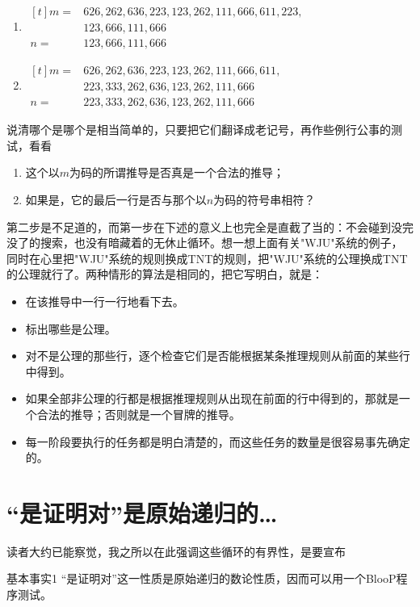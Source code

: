 \begin{enumerate}
\item $\begin{aligned}[t]
  m={}&626, 262, 636, 223, 123, 262, 111, 666, 611, 223,\\
      &123, 666, 111, 666\\
  n={}&123, 666, 111, 666
\end{aligned}$
\item $\begin{aligned}[t]
  m={}&626, 262, 636, 223, 123, 262, 111, 666, 611,\\
      &223, 333, 262, 636, 123, 262, 111, 666\\
  n={}&223, 333, 262, 636, 123, 262, 111, 666
\end{aligned}$
\end{enumerate}
说清哪个是哪个是相当简单的，只要把它们翻译成老记号，再作些例行公事的测试，看看
\begin{enumerate}
\item 这个以$m$为码的所谓推导是否真是一个合法的推导；
\item 如果是，它的最后一行是否与那个以$n$为码的符号串相符？
\end{enumerate}
第二步是不足道的，而第一步在下述的意义上也完全是直截了当的：不会碰到没完没了的搜索，也没有暗藏着的无休止循环。想一想上面有关"WJU"系统的例子，同时在心里把"WJU"系统的规则换成TNT的规则，把"WJU"系统的公理换成TNT的公理就行了。两种情形的算法是相同的，把它写明白，就是：
\begin{itemize}
\item 在该推导中一行一行地看下去。
\item 标出哪些是公理。
\item 对不是公理的那些行，逐个检查它们是否能根据某条推理规则从前面的某些行中得到。
\item 如果全部非公理的行都是根据推理规则从出现在前面的行中得到的，那就是一个合法的推导；否则就是一个冒牌的推导。
\item 每一阶段要执行的任务都是明白清楚的，而这些任务的数量是很容易事先确定的。
\end{itemize}

\section{“是证明对”是原始递归的…}

读者大约已能察觉，我之所以在此强调这些循环的有界性，是要宣布

\begin{thm}{基本事实1}
“是证明对”这一性质是原始递归的数论性质，因而可以用一个BlooP程序测试。
\end{thm}

